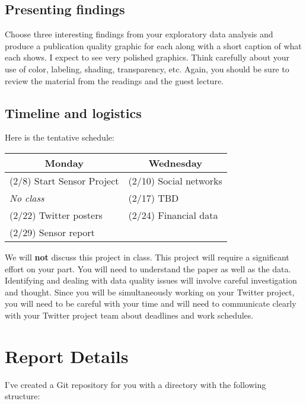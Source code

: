 \documentclass[11pt, oneside]{article}   	%
\begin{document}
\subsection*{Presenting findings}

Choose three interesting findings from your exploratory data analysis and
produce a publication quality graphic for each along with a short caption of
what each shows. I expect to see very polished graphics. Think carefully about
your use of color, labeling, shading, transparency, etc. Again, you should be
sure to review the material from the readings and the guest lecture.

\subsection*{Timeline and logistics}

Here is the tentative schedule:

\begin{table}[h]
\centering
\begin{tabular}{@{}l|l@{}}
\toprule
\multicolumn{1}{c|}{Monday} & \multicolumn{1}{c}{Wednesday} \\
\hline
(2/8) Start Sensor Project    & (2/10) Social networks \\
\emph{\hspace{12mm} No class} & (2/17) TBD \\
(2/22) Twitter posters        & (2/24) Financial data \\
(2/29) Sensor report          & \\
\bottomrule
\end{tabular}
\end{table}

We will \textbf{not} discuss this project in class.  This project will require
a significant effort on your part.  You will need to understand the paper as
well as the data.  Identifying and dealing with data quality issues will
involve careful investigation and thought.  Since you will be simultaneously
working on your Twitter project, you will need to be careful with your time and
will need to communicate clearly with your Twitter project team about deadlines
and work schedules.

\section{Report Details}

I've created a Git repository for you with a directory with the following
structure:
\end{document}
